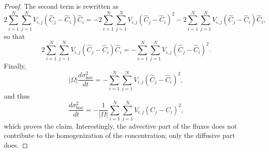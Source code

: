 \begin{proof}
	The second term is rewritten as
	\begin{equation}
 		2 \sum_{i=1}^N \sum_{j=1}^N V_{i,j} (\hat C_j - \hat C_i) \hat C_i = -2 \sum_{i=1}^N \sum_{j=1}^N V_{i,j} (\hat C_j - \hat C_i)^2 - 2\sum_{i=1}^N \sum_{j=1}^N V_{i,j} (\hat C_j - \hat C_i) \hat C_i,
	 \end{equation} 
	 so that
	 \begin{equation}
	 	2 \sum_{i=1}^N \sum_{j=1}^N V_{i,j} (\hat C_j - \hat C_i) \hat C_i = - \sum_{i=1}^N \sum_{j=1}^N V_{i,j} (\hat C_j - \hat C_i)^2.
	 \end{equation}
	 Finally,
	 \begin{equation}
	 	|\Omega| \frac{d \sigma^2_{box}}{dt} = - \sum_{i=1}^N \sum_{j=1}^N V_{i,j} (\hat C_j - \hat C_i)^2,
	 \end{equation}
	 and thus
	 \begin{equation}
	 	\frac{d \sigma^2_{box}}{dt} = -\frac{1}{|\Omega|} \sum_{i=1}^N \sum_{j=1}^N V_{i,j} (C_j - C_i)^2,
	 \end{equation}
	 which proves the claim.  Interestingly, the advective part of the fluxes does not contribute to the homogenization of the concentration; only the diffusive part does.
\end{proof}